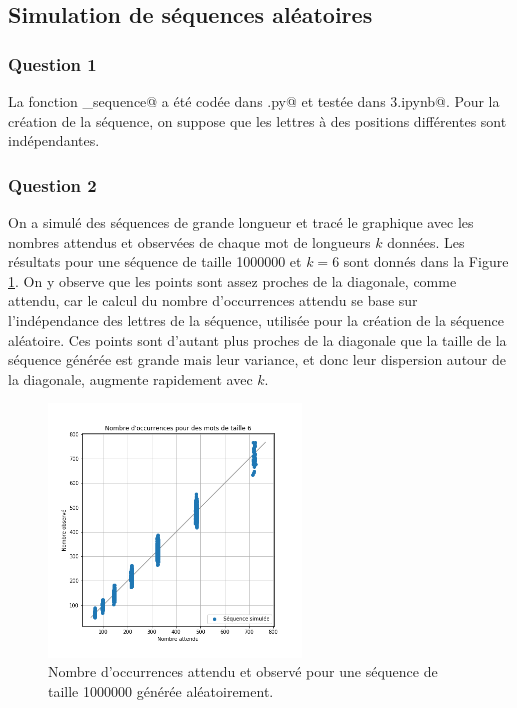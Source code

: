 \documentclass[a4paper,12pt]{article}
\begin{document}
\subsection{Simulation de séquences aléatoires}

\subsubsection*{Question 1}

La fonction \verb@simule_sequence@ a été codée dans \verb@projet.py@ et testée dans \verb@Projet3.ipynb@. Pour la création de la séquence, on suppose que les lettres à des positions différentes sont indépendantes.

\subsubsection*{Question 2}

On a simulé des séquences de grande longueur et tracé le graphique avec les nombres attendus et observées de chaque mot de longueurs $k$ données. Les résultats pour une séquence de taille 1000000 et $k = 6$ sont donnés dans la Figure \ref{FigOccurrencesSimul}. On y observe que les points sont assez proches de la diagonale, comme attendu, car le calcul du nombre d'occurrences attendu se base sur l'indépendance des lettres de la séquence, utilisée pour la création de la séquence aléatoire. Ces points sont d'autant plus proches de la diagonale que la taille de la séquence générée est grande mais leur variance, et donc leur dispersion autour de la diagonale, augmente rapidement avec $k$.

\begin{figure}
\centering
\includegraphics[width=0.6\textwidth]{Figures/graphe_occurrences_simul.png}
\caption{Nombre d'occurrences attendu et observé pour une séquence de taille 1000000 générée aléatoirement.}
\label{FigOccurrencesSimul}
\end{figure}
\end{document}
